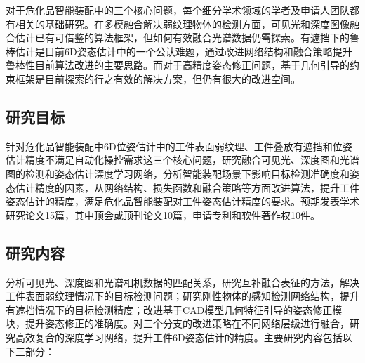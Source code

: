 \documentclass[12pt]{article}
\begin{document}
对于危化品智能装配中的三个核心问题，每个细分学术领域的学者及申请人团队都有相关的基础研究。在多模融合解决弱纹理物体的检测方面，可见光和深度图像融合估计已有可借鉴的算法框架，但如何有效融合光谱数据仍需探索。有遮挡下的鲁棒估计是目前6D姿态估计中的一个公认难题，通过改进网络结构和融合策略提升鲁棒性目前算法改进的主要思路。而对于高精度姿态修正问题，基于几何引导的约束框架是目前探索的行之有效的解决方案，但仍有很大的改进空间。

{


}



\subsection{研究目标}

针对危化品智能装配中6D位姿估计中的工件表面弱纹理、工件叠放有遮挡和位姿估计精度不满足自动化操控需求这三个核心问题，研究融合可见光、深度图和光谱图的检测和姿态估计深度学习网络，分析智能装配场景下影响目标检测准确度和姿态估计精度的因素，从网络结构、损失函数和融合策略等方面改进算法，提升工件姿态估计的精度，满足危化品智能装配对工件姿态估计精度的要求。预期发表学术研究论文15篇，其中顶会或顶刊论文10篇，申请专利和软件著作权10件。

\subsection{研究内容}

分析可见光、深度图和光谱相机数据的匹配关系，研究互补融合表征的方法，解决工件表面弱纹理情况下的目标检测问题；研究刚性物体的感知检测网络结构，提升有遮挡情况下的目标检测精度；改进基于CAD模型几何特征引导的姿态修正模块，提升姿态修正的准确度。对三个分支的改进策略在不同网络层级进行融合，研究高效复合的深度学习网络，提升工件6D姿态估计的精度。主要研究内容包括以下三部分：
\end{document}
